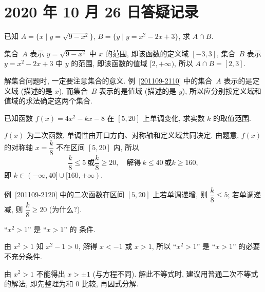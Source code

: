 \section{2020 年 10 月 26 日答疑记录}


\begin{example}\label{201109-2110}
    已知 $A=\{x\mid y=\sqrt{9-x^2}\}$, $B=\{y\mid y=x^2-2x+3\}$, 求 $A\cap B$.
\end{example}
\begin{solution}
    集合~$A$ 表示 $y=\sqrt{9-x^2}$ 中 $x$ 的范围, 即该函数的定义域 $[-3,3]$, 集合~$B$ 表示 $y=x^2-2x+3$ 中 $y$ 的范围, 即该函数的值域 $[2,+\infty)$, 所以 $A\cap B= [2,3]$.
\end{solution}
\begin{remark}
    解集合问题时, 一定要注意集合的意义. 例~\ref{201109-2110} 中的集合~$A$ 表示的是定义域 (描述的是 $x$), 而集合~$B$ 表示的是值域 (描述的是 $y$), 所以应分别按定义域和值域的求法确定这两个集合.
\end{remark}

\begin{example}\label{201109-2120}
    已知函数 $f(x)= 4x^2-kx-8$ 在 $[5,20]$ 上单调变化, 求实数 $k$ 的取值范围.
\end{example}
\begin{solution}
    $f(x)$ 为二次函数, 单调性由开口方向、对称轴和定义域共同决定. 由题意, $f(x)$ 的对称轴 $x=\dfrac{k}8$ 不在区间 $[5,20]$ 内, 所以
    \[\frac{k}8\leqslant 5\ \text{或} \frac{k}8\geqslant 20,\quad
        \text{解得}\ k\leqslant 40\ \text{或} k\geqslant 160,\]
    即 $k\in(-\infty,40]\cup [160,+\infty)$.
\end{solution}
\begin{remark}
    例~\ref{201109-2120} 中的二次函数在区间 $[5,20]$ 上若单调递增, 则 $\dfrac{k}8\leqslant 5$; 若单调递减, 则 $\dfrac{k}8\geqslant 20$ (为什么?).
\end{remark}


\begin{example}
    ``$x^2>1$'' 是 ``$x>1$'' 的 \underline{\qquad} 条件.
\end{example}
\begin{solution}
    由 $x^2>1$ 知 $x^2-1>0$, 解得 $x<-1$ 或 $x>1$, 所以 ``$x^2>1$'' 是 ``$x>1$'' 的必要不充分条件.
\end{solution}
\begin{remark}
    由 $x^2>1$ 不能得出 $x>\pm1$ (与方程不同). 解此不等式时, 建议用普通二次不等式的解法, 即先整理为和 $0$ 比较, 再因式分解.
\end{remark}

